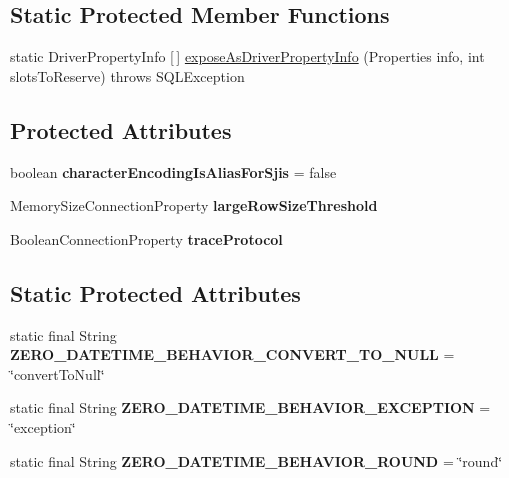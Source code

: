 \subsection*{Static Protected Member Functions}
\begin{DoxyCompactItemize}
\item 
static Driver\+Property\+Info \mbox{[}$\,$\mbox{]} \mbox{\hyperlink{classcom_1_1mysql_1_1jdbc_1_1_connection_properties_impl_a810088febe63fb8c4bf25651f6b92020}{expose\+As\+Driver\+Property\+Info}} (Properties info, int slots\+To\+Reserve)  throws S\+Q\+L\+Exception 
\end{DoxyCompactItemize}
\subsection*{Protected Attributes}
\begin{DoxyCompactItemize}
\item 
\mbox{\label{classcom_1_1mysql_1_1jdbc_1_1_connection_properties_impl_a5a935f7c57f193d4388d811367abcd69}} 
boolean {\bfseries character\+Encoding\+Is\+Alias\+For\+Sjis} = false
\item 
Memory\+Size\+Connection\+Property {\bfseries large\+Row\+Size\+Threshold}
\item 
Boolean\+Connection\+Property {\bfseries trace\+Protocol}
\end{DoxyCompactItemize}
\subsection*{Static Protected Attributes}
\begin{DoxyCompactItemize}
\item 
\mbox{\label{classcom_1_1mysql_1_1jdbc_1_1_connection_properties_impl_ab47dba5afe3d9f6d225a876dd42cf35b}} 
static final String {\bfseries Z\+E\+R\+O\+\_\+\+D\+A\+T\+E\+T\+I\+M\+E\+\_\+\+B\+E\+H\+A\+V\+I\+O\+R\+\_\+\+C\+O\+N\+V\+E\+R\+T\+\_\+\+T\+O\+\_\+\+N\+U\+LL} = \char`\"{}convert\+To\+Null\char`\"{}
\item 
\mbox{\label{classcom_1_1mysql_1_1jdbc_1_1_connection_properties_impl_aec1de9f779d2adf027b6e559036b9185}} 
static final String {\bfseries Z\+E\+R\+O\+\_\+\+D\+A\+T\+E\+T\+I\+M\+E\+\_\+\+B\+E\+H\+A\+V\+I\+O\+R\+\_\+\+E\+X\+C\+E\+P\+T\+I\+ON} = \char`\"{}exception\char`\"{}
\item 
\mbox{\label{classcom_1_1mysql_1_1jdbc_1_1_connection_properties_impl_abfa22c7f480766d4fcbe84e2b8cb85f6}} 
static final String {\bfseries Z\+E\+R\+O\+\_\+\+D\+A\+T\+E\+T\+I\+M\+E\+\_\+\+B\+E\+H\+A\+V\+I\+O\+R\+\_\+\+R\+O\+U\+ND} = \char`\"{}round\char`\"{}
\end{DoxyCompactItemize}


